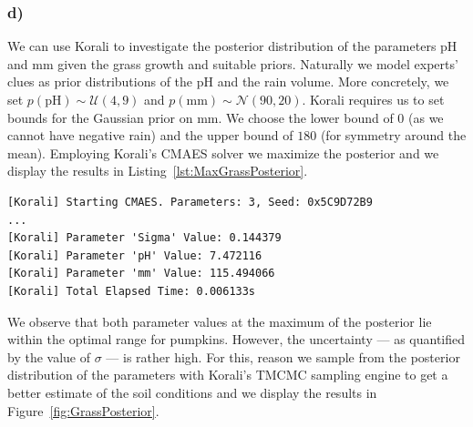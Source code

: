 \documentclass{article}
\begin{document}
    \subsubsection*{d)}
    \label{subsubsec:Task1d}

    We can use Korali to investigate the posterior distribution of the
    parameters pH and mm given the grass growth and suitable priors.
    Naturally we model experts' clues as prior distributions of the pH and the
    rain volume.
    More concretely, we set $p(\text{pH}) \sim \mathcal{U}(4, 9)$ and
    $p(\text{mm}) \sim \mathcal{N}(90, 20)$.
    Korali requires us to set bounds for the Gaussian prior on mm.
    We choose the lower bound of $0$ (as we cannot have negative rain) and
    the upper bound of $180$ (for symmetry around the mean).
    Employing Korali's CMAES solver we maximize the posterior and we display
    the results in Listing~\ref{lst:MaxGrassPosterior}.

    \begin{lstlisting}[basicstyle=\tiny, frame=single, caption={Korali
    output when maximizing the posterior of the pH and mm parameters.},
    label={lst:MaxGrassPosterior}]
[Korali] Starting CMAES. Parameters: 3, Seed: 0x5C9D72B9
...
[Korali] Parameter 'Sigma' Value: 0.144379
[Korali] Parameter 'pH' Value: 7.472116
[Korali] Parameter 'mm' Value: 115.494066
[Korali] Total Elapsed Time: 0.006133s
    \end{lstlisting}

    We observe that both parameter values at the maximum of the posterior lie
    within the optimal range for pumpkins.
    However, the uncertainty --- as quantified by the value of $\sigma$ --- is
    rather high.
    For this, reason we sample from the posterior distribution of the
    parameters with Korali's TMCMC sampling engine to get a better estimate
    of the soil conditions and we display the results in
    Figure~\ref{fig:GrassPosterior}.
\end{document}

